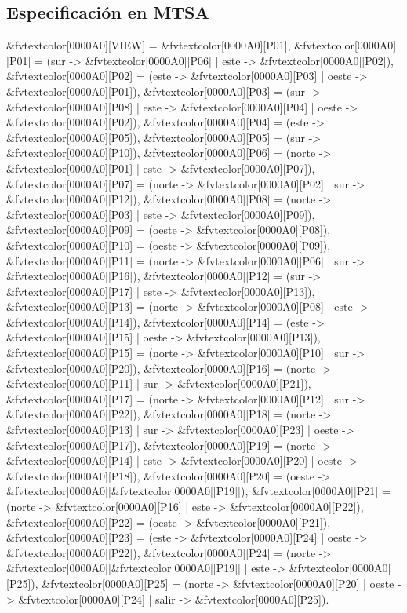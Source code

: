 \subsection{Especificación en MTSA}

\begin{Code}[commandchars=&\[\]]
&fvtextcolor[0000A0][VIEW] = &fvtextcolor[0000A0][P01],
&fvtextcolor[0000A0][P01]  = (sur   -> &fvtextcolor[0000A0][P06] | este  -> &fvtextcolor[0000A0][P02]),
&fvtextcolor[0000A0][P02]  = (este  -> &fvtextcolor[0000A0][P03] | oeste -> &fvtextcolor[0000A0][P01]),
&fvtextcolor[0000A0][P03]  = (sur   -> &fvtextcolor[0000A0][P08] | este  -> &fvtextcolor[0000A0][P04] | oeste -> &fvtextcolor[0000A0][P02]),
&fvtextcolor[0000A0][P04]  = (este  -> &fvtextcolor[0000A0][P05]),
&fvtextcolor[0000A0][P05]  = (sur   -> &fvtextcolor[0000A0][P10]),
&fvtextcolor[0000A0][P06]  = (norte -> &fvtextcolor[0000A0][P01] | este  -> &fvtextcolor[0000A0][P07]),
&fvtextcolor[0000A0][P07]  = (norte -> &fvtextcolor[0000A0][P02] | sur   -> &fvtextcolor[0000A0][P12]),
&fvtextcolor[0000A0][P08]  = (norte -> &fvtextcolor[0000A0][P03] | este  -> &fvtextcolor[0000A0][P09]),
&fvtextcolor[0000A0][P09]  = (oeste -> &fvtextcolor[0000A0][P08]),
&fvtextcolor[0000A0][P10]  = (oeste -> &fvtextcolor[0000A0][P09]),
&fvtextcolor[0000A0][P11]  = (norte -> &fvtextcolor[0000A0][P06] | sur   -> &fvtextcolor[0000A0][P16]),
&fvtextcolor[0000A0][P12]  = (sur   -> &fvtextcolor[0000A0][P17] | este  -> &fvtextcolor[0000A0][P13]),
&fvtextcolor[0000A0][P13]  = (norte -> &fvtextcolor[0000A0][P08] | este  -> &fvtextcolor[0000A0][P14]),
&fvtextcolor[0000A0][P14]  = (este  -> &fvtextcolor[0000A0][P15] | oeste -> &fvtextcolor[0000A0][P13]),
&fvtextcolor[0000A0][P15]  = (norte -> &fvtextcolor[0000A0][P10] | sur   -> &fvtextcolor[0000A0][P20]),
&fvtextcolor[0000A0][P16]  = (norte -> &fvtextcolor[0000A0][P11] | sur   -> &fvtextcolor[0000A0][P21]),
&fvtextcolor[0000A0][P17]  = (norte -> &fvtextcolor[0000A0][P12] | sur   -> &fvtextcolor[0000A0][P22]),
&fvtextcolor[0000A0][P18]  = (norte -> &fvtextcolor[0000A0][P13] | sur   -> &fvtextcolor[0000A0][P23] | oeste -> &fvtextcolor[0000A0][P17]),
&fvtextcolor[0000A0][P19]  = (norte -> &fvtextcolor[0000A0][P14] | este  -> &fvtextcolor[0000A0][P20] | oeste -> &fvtextcolor[0000A0][P18]),
&fvtextcolor[0000A0][P20]  = (oeste -> &fvtextcolor[0000A0][&fvtextcolor[0000A0][P19]]),
&fvtextcolor[0000A0][P21]  = (norte -> &fvtextcolor[0000A0][P16] | este  -> &fvtextcolor[0000A0][P22]),
&fvtextcolor[0000A0][P22]  = (oeste -> &fvtextcolor[0000A0][P21]),
&fvtextcolor[0000A0][P23]  = (este  -> &fvtextcolor[0000A0][P24] | oeste -> &fvtextcolor[0000A0][P22]),
&fvtextcolor[0000A0][P24]  = (norte -> &fvtextcolor[0000A0][&fvtextcolor[0000A0][P19]] | este  -> &fvtextcolor[0000A0][P25]),
&fvtextcolor[0000A0][P25]  = (norte -> &fvtextcolor[0000A0][P20] | oeste -> &fvtextcolor[0000A0][P24] | salir -> &fvtextcolor[0000A0][P25]).


\end{Code}
